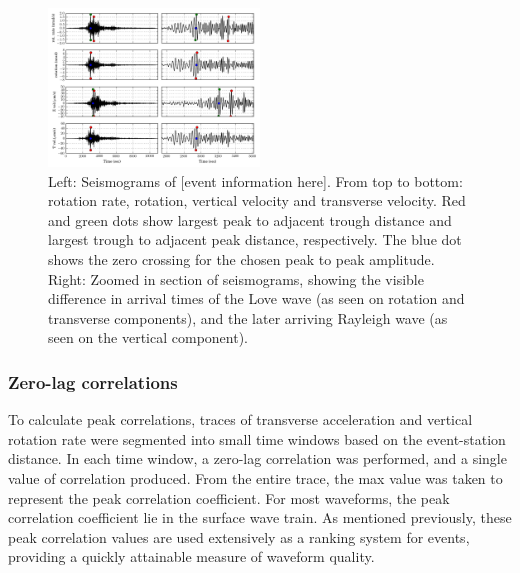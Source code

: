 \documentclass{gji}
\begin{document}
\begin{figure}
\centerline{\includegraphics[width=0.5\textwidth]{amp_picking}}
\caption{Left: Seismograms of [event information here]. From top to bottom: rotation rate, rotation, vertical velocity and transverse velocity. Red and green dots show largest peak to adjacent trough distance and largest trough to adjacent peak distance, respectively. The blue dot shows the zero crossing for the chosen peak to peak amplitude. \newline Right: Zoomed in section of seismograms, showing the visible difference in arrival times of the Love wave (as seen on rotation and transverse components), and the later arriving Rayleigh wave (as seen on the vertical component). }
\label{fig:obswav}
\end{figure}


\subsubsection{Zero-lag correlations}
To calculate peak correlations, traces of transverse acceleration and vertical rotation rate were segmented into small time windows based on the event-station distance. In each time window, a zero-lag correlation was performed, and a single value of correlation produced. From the entire trace, the max value was taken to represent the peak correlation coefficient. For most waveforms, the peak correlation coefficient lie in the surface wave train. As mentioned previously, these peak correlation values are used extensively as a ranking system for events, providing a quickly attainable measure of waveform quality.
\end{document}
